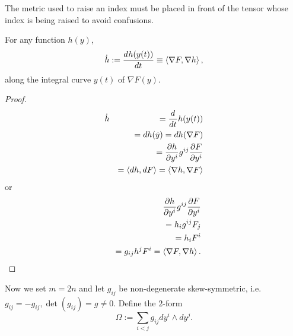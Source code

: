 \begin{remark}
	The metric used to raise an index must be placed in front of the tensor whose index is being raised to avoid confusions.
\end{remark}

\begin{lemma}
	For any function $h(y)$, \[ \dot{h} := \frac{d^{} h(y(t))}{d t^{}} \equiv \left< \nabla F, \nabla h \right>, \] along the integral curve $y(t)$ of $\nabla F(y)$.
\end{lemma}
\begin{proof}
	\begin{eqnarray}
		\dot{h} &&= \frac{d^{}  }{d t^{}} h(y(t))
		\nonumber\\
		&&= dh(\dot{y}) = dh(\nabla F)
		\nonumber\\
		&&= \frac{ \partial h}{ \partial y^i } g^{ij} \frac{ \partial F}{ \partial y^i }
		\nonumber\\
		&&= \left< dh, dF \right> = \left< \nabla h, \nabla F \right>
		\nonumber
	\end{eqnarray}
	or
	\begin{eqnarray}
		&&\frac{ \partial h}{ \partial y^i } g^{ij} \frac{ \partial F}{ \partial y^i }
		\nonumber\\
		&&= h_i g^{ij} F_j
		\nonumber\\
		&&= h_i F^i
		\nonumber\\
		&&= g_{ij} h^j F^i = \left< \nabla F, \nabla h \right>.
		\nonumber
	\end{eqnarray}
\end{proof}

Now we set $m = 2n$ and let $g_{ij}$ be non-degenerate skew-symmetric, i.e. $g_{ij} = -g_{ij}, \det(g_{ij}) = g \neq 0$. Define the $2$-form
\[ \Omega := \sum_{i<j} g_{ij} dy^i \wedge dy^j. \]

